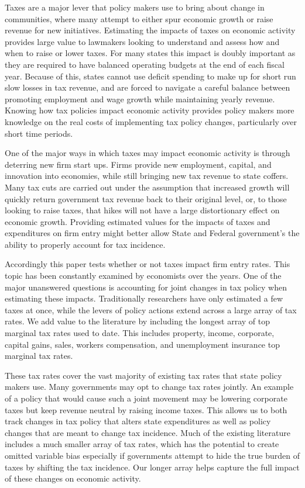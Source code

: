 
Taxes are a major lever that policy makers use to bring about change in communities, where many attempt to either spur economic growth or raise revenue for new initiatives. Estimating the impacts of taxes on economic activity provides large value to lawmakers looking to understand and assess how and when to raise or lower taxes. For many states this impact is doubly important as they are required to have balanced operating budgets at the end of each fiscal year. Because of this, states cannot use deficit spending to make up for short run slow losses in tax revenue, and are forced to navigate a careful balance between promoting employment and wage growth while maintaining yearly revenue. Knowing how tax policies impact economic activity provides policy makers more knowledge on the real costs of implementing tax policy changes, particularly over short time periods.

One of the major ways in which taxes may impact economic activity is through deterring new firm start ups. Firms provide new employment, capital, and innovation into economies, while still bringing new tax revenue to state coffers. Many tax cuts are carried out under the assumption that increased growth will quickly return government tax revenue back to their original level, or, to those looking to raise taxes, that hikes will not have a large distortionary effect on economic growth. Providing estimated values for the impacts of taxes and expenditures on firm entry might better allow State and Federal government's the ability to properly account for tax incidence.

Accordingly this paper tests whether or not taxes impact firm entry rates. This topic has been constantly examined by economists over the years. One of the major unanswered questions is accounting for joint changes in tax policy when estimating these impacts. Traditionally researchers have only estimated a few taxes at once, while the levers of policy actions extend across a large array of tax rates. We add value to the literature by including the longest array of top marginal tax rates used to date. This includes property, income, corporate, capital gains, sales, workers compensation, and unemployment insurance top marginal tax rates.

These tax rates cover the vast majority of existing tax rates that state policy makers use. Many governments may opt to change tax rates jointly. An example of a policy that would cause such a joint movement may be lowering corporate taxes but keep revenue neutral by raising income taxes. This allows us to both track changes in tax policy that alters state expenditures as well as policy changes that are meant to change tax incidence. Much of the existing literature includes a much smaller array of tax rates, which has the potential to create omitted variable bias especially if governments attempt to hide the true burden of taxes by shifting the tax incidence. Our longer array helps capture the full impact of these changes on economic activity.

